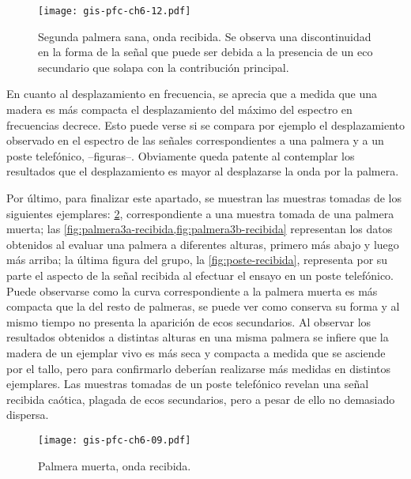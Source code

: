 \begin{figure}[p]
    \begin{center}
	\texttt{[image: gis-pfc-ch6-12.pdf]}
    \end{center}
    \caption[Segunda palmera sana (onda recibida)]{Segunda palmera sana,
    onda recibida. Se observa una discontinuidad en la forma de la señal
    que puede ser debida a la presencia de un eco secundario que solapa con
    la contribución principal.}
    \label{fig:palmera2-recibida}
\end{figure}

En cuanto al desplazamiento en frecuencia, se aprecia que a medida que una
madera es más compacta el desplazamiento del máximo del espectro en
frecuencias decrece. Esto puede verse si se compara por ejemplo el
desplazamiento observado en el espectro de las señales correspondientes a
una palmera y a un poste telefónico,  --figuras--. Obviamente queda patente
al contemplar los resultados que el desplazamiento es mayor al desplazarse
la onda por la palmera.

Por último, para finalizar este apartado, se muestran las muestras tomadas
de los siguientes ejemplares: \cref{fig:palmeramuerta-recibida},
correspondiente a una muestra tomada de una palmera muerta; las
\cref{fig:palmera3a-recibida,fig:palmera3b-recibida} representan los datos
obtenidos al evaluar una palmera a diferentes alturas, primero más abajo y
luego más arriba; la última figura del grupo, la \cref{fig:poste-recibida},
representa por su parte el aspecto de la señal recibida al efectuar el
ensayo en un poste telefónico. Puede observarse como la curva
correspondiente a la palmera muerta es más compacta que la del resto de
palmeras, se puede ver como conserva su forma y al mismo tiempo no presenta
la aparición de ecos secundarios. Al observar los resultados obtenidos a
distintas alturas en una misma palmera se infiere que la madera de un
ejemplar vivo es más seca y compacta a medida que se asciende por el tallo,
pero para confirmarlo deberían realizarse más medidas en distintos
ejemplares. Las muestras tomadas de un poste telefónico revelan una señal
recibida caótica, plagada de ecos secundarios, pero a pesar de ello no
demasiado dispersa.

\begin{figure}[p]
    \begin{center}
	\texttt{[image: gis-pfc-ch6-09.pdf]}
    \end{center}
    \caption[Palmera muerta (onda recibida)]{Palmera muerta, onda
    recibida.}
    \label{fig:palmeramuerta-recibida}
\end{figure}

